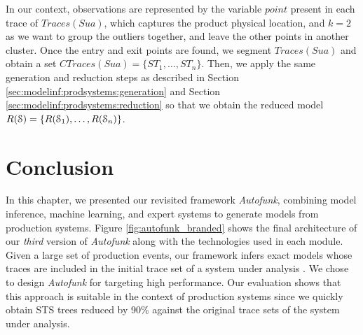 In our context, observations are represented by the variable
$point$ present in each trace of $Traces({Sua})$, which captures
the product physical location, and $k=2$ as we want to group the
outliers together, and leave the other points in another cluster.
Once the entry and exit points are found, we segment
$Traces({Sua})$ and obtain a set $CTraces({Sua})=\{ST_1, \dots,
ST_n\}$. Then, we apply the same generation and reduction steps
as described in Section \ref{sec:modelinf:prodsystems:generation}
and Section \ref{sec:modelinf:prodsystems:reduction} so that we
obtain the reduced model $R(\EuScript{S}) =
\{R(\EuScript{S}_1),\dots,R(\EuScript{S}_n)\}$.


\section{Conclusion}
\label{sec:modelinf:prodsystems:conclusion}

In this chapter, we presented our revisited framework
\textit{Autofunk}, combining model inference, machine learning,
and expert systems to generate models from production systems.
Figure \ref{fig:autofunk_branded} shows the final architecture of
our \emph{third} version of \textit{Autofunk} along with the
technologies used in each module. Given a large set of production
events, our framework infers exact models whose traces are
included in the initial trace set of a system under analysis
\cite{petrenko06}.  We chose to design \textit{Autofunk} for
targeting high performance. Our evaluation shows that this
approach is suitable in the context of production systems since
we quickly obtain STS trees reduced by 90\% against the original
trace sets of the system under analysis.

